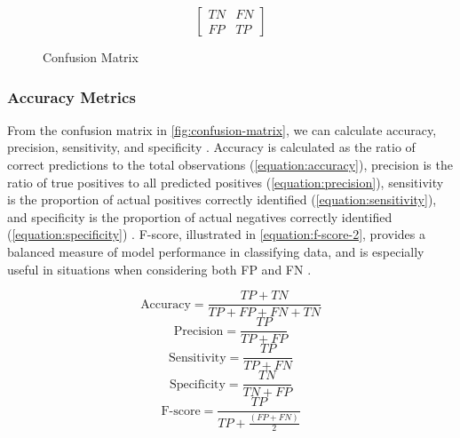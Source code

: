 \begin{figure}[H]
\centering
\[
\begin{bmatrix}
    TN & FN \\
    FP & TP
\end{bmatrix}
\]
\caption{{Confusion Matrix}}
\label{fig:confusion-matrix}
\end{figure}



\subsubsection{Accuracy Metrics}

From the confusion matrix in \autoref{fig:confusion-matrix}, we can calculate accuracy, precision, sensitivity, and specificity \parencite{coenen-confusion-matrix}. Accuracy is calculated as the ratio of correct predictions to the total observations (\autoref{equation:accuracy}), precision is the ratio of true positives to all predicted positives (\autoref{equation:precision}), sensitivity is the proportion of actual positives correctly identified (\autoref{equation:sensitivity}), and specificity is the proportion of actual negatives correctly identified (\autoref{equation:specificity}) \parencite{coenen-confusion-matrix}. F-score, illustrated in \autoref{equation:f-score-2}, provides a balanced measure of model performance in classifying data, and is especially useful in situations when considering both FP and FN \parencite{xgboost-performance-analysis-of-classifier-with-missing-data}.  

\begin{equation}
\label{equation:accuracy}
\text{Accuracy} = \frac{TP + TN}{TP + FP + FN + TN} 
\end{equation}
\begin{equation}
\label{equation:precision}
\text{Precision} = \frac{TP}{TP + FP} 
\end{equation}
\begin{equation}
\label{equation:sensitivity}
\text{Sensitivity} = \frac{TP}{TP + FN}
\end{equation}
\begin{equation}
\label{equation:specificity}
\text{Specificity} = \frac{TN}{TN + FP}
\end{equation}
\begin{equation}
\label{equation:f-score-2}
    \text{F-score} = \frac{TP}{TP + \frac{(FP+FN)}{2}}
\end{equation}

